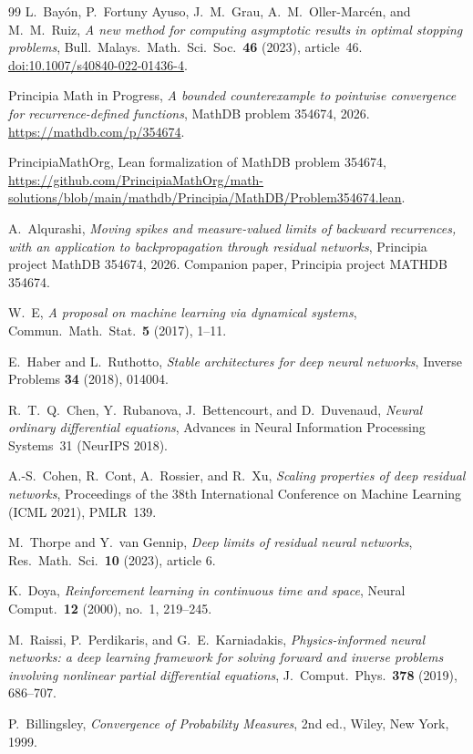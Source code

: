 \documentclass[11pt]{article}
\theoremstyle{plain}
\theoremstyle{remark}
\begin{document}
\begin{thebibliography}{99}\small
{}
L.~Bay\'on, P.~Fortuny Ayuso, J.~M.~Grau, A.~M.~Oller-Marc\'en, and M.~M.~Ruiz,
\emph{A new method for computing asymptotic results in optimal stopping problems},
Bull.\ Malays.\ Math.\ Sci.\ Soc.\ \textbf{46} (2023), article~46.
\href{https://doi.org/10.1007/s40840-022-01436-4}{doi:10.1007/s40840-022-01436-4}.

Principia Math in Progress, \emph{A bounded counterexample to pointwise convergence for
recurrence-defined functions}, MathDB problem 354674, 2026.
\url{https://mathdb.com/p/354674}.

PrincipiaMathOrg, Lean formalization of MathDB problem 354674,
\url{https://github.com/PrincipiaMathOrg/math-solutions/blob/main/mathdb/Principia/MathDB/Problem354674.lean}.

A.~Alqurashi, \emph{Moving spikes and measure-valued limits of backward recurrences, with an application to backpropagation through residual networks}, Principia project MathDB 354674, 2026.
Companion paper, Principia project MATHDB 354674.

W.~E, \emph{A proposal on machine learning via dynamical systems},
Commun.\ Math.\ Stat.\ \textbf{5} (2017), 1--11.

E.~Haber and L.~Ruthotto, \emph{Stable architectures for deep neural networks},
Inverse Problems \textbf{34} (2018), 014004.

R.~T.~Q.~Chen, Y.~Rubanova, J.~Bettencourt, and D.~Duvenaud,
\emph{Neural ordinary differential equations}, Advances in Neural Information Processing
Systems~31 (NeurIPS 2018).

A.-S.~Cohen, R.~Cont, A.~Rossier, and R.~Xu, \emph{Scaling properties of deep residual
networks}, Proceedings of the 38th International Conference on Machine Learning
(ICML 2021), PMLR~139.

M.~Thorpe and Y.~van Gennip, \emph{Deep limits of residual neural networks},
Res.\ Math.\ Sci.\ \textbf{10} (2023), article 6.

K.~Doya, \emph{Reinforcement learning in continuous time and space},
Neural Comput.\ \textbf{12} (2000), no.~1, 219--245.

M.~Raissi, P.~Perdikaris, and G.~E.~Karniadakis, \emph{Physics-informed neural networks: a
deep learning framework for solving forward and inverse problems involving nonlinear partial
differential equations}, J.\ Comput.\ Phys.\ \textbf{378} (2019), 686--707.

P.~Billingsley, \emph{Convergence of Probability Measures}, 2nd ed., Wiley, New York, 1999.
\end{thebibliography}
\end{document}
